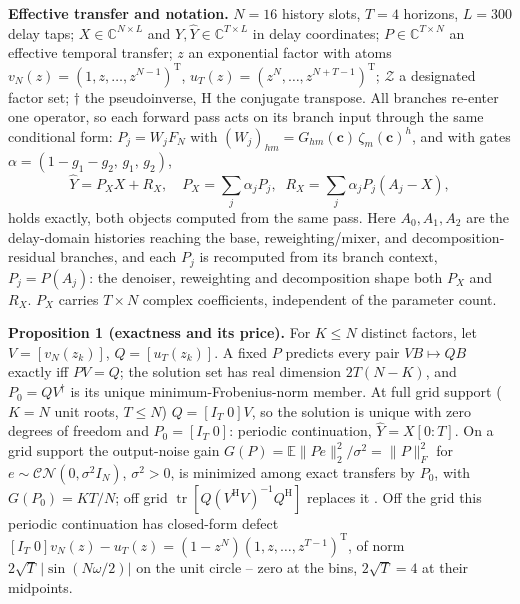 \documentclass{article}
\newcommand{\cc}{\mathbf{c}}
\begin{document}
\textbf{Effective transfer and notation.} $N{=}16$ history slots,
$T{=}4$ horizons, $L{=}300$ delay taps; $X\in\mathbb{C}^{N\times L}$ and
$Y,\widehat Y\in\mathbb{C}^{T\times L}$ in delay coordinates;
$P\in\mathbb{C}^{T\times N}$ an effective temporal transfer; $z$ an
exponential factor with atoms
$v_N(z)=(1,z,\ldots,z^{N-1})^{\mathrm T}$,
$u_T(z)=(z^{N},\ldots,z^{N+T-1})^{\mathrm T}$; $\mathcal Z$ a designated
factor set; $\dagger$ the pseudoinverse, $\mathrm{H}$ the conjugate
transpose. All branches re-enter one operator, so each
forward pass acts on its branch input through the same conditional
form: $P_j=W_jF_N$ with $(W_j)_{hm}=G_{hm}(\cc)\,\zeta_m(\cc)^h$, and with
gates $\alpha=(1{-}g_1{-}g_2,\,g_1,\,g_2)$,
\begin{equation}
\widehat Y=P_XX+R_X,\quad
P_X=\textstyle\sum_j\alpha_jP_j,\;\;
R_X=\sum_j\alpha_jP_j(A_j{-}X),
\label{eq:expansion}
\end{equation}
holds exactly, both objects computed from the same pass. Here
$A_0,A_1,A_2$ are the delay-domain histories reaching the base,
reweighting/mixer, and decomposition-residual branches, and each
$P_j$ is recomputed from its branch context, $P_j=P(A_j)$: the
denoiser, reweighting and decomposition shape both $P_X$ and
$R_X$. $P_X$ carries $T{\times}N$ complex coefficients, independent
of the parameter count.

\textbf{Proposition 1 (exactness and its price).} For $K\le N$ distinct
factors, let $V=[v_N(z_k)]$, $Q=[u_T(z_k)]$. A fixed $P$ predicts every
pair $VB\mapsto QB$ exactly iff $PV=Q$; the solution set has real
dimension $2T(N{-}K)$, and $P_0=QV^{\dagger}$ is its unique
minimum-Frobenius-norm member. At full grid support ($K{=}N$ unit roots,
$T\le N$) $Q=[I_T\;0]V$, so the solution is unique with zero degrees of freedom
and $P_0=[I_T\;0]$: periodic continuation, $\widehat Y=X[0{:}T]$. On a
grid support the output-noise gain
$G(P)=\mathbb{E}\|Pe\|_2^2/\sigma^2=\|P\|_F^2$ for
$e\sim\mathcal{CN}(0,\sigma^2I_N)$, $\sigma^2>0$, is minimized among exact transfers by
$P_0$, with $G(P_0)=KT/N$; off grid
$\operatorname{tr}[Q(V^{\mathrm H}V)^{-1}Q^{\mathrm H}]$ replaces it
\cite{golub2013matrix}. Off the grid this periodic continuation has
closed-form defect
$[I_T\;0]v_N(z)-u_T(z)=(1{-}z^{N})(1,z,\ldots,z^{T-1})^{\mathrm T}$, of
norm $2\sqrt{T}\,|\sin(N\omega/2)|$ on the unit circle -- zero at the
bins, $2\sqrt{T}{=}4$ at their midpoints.
\end{document}
